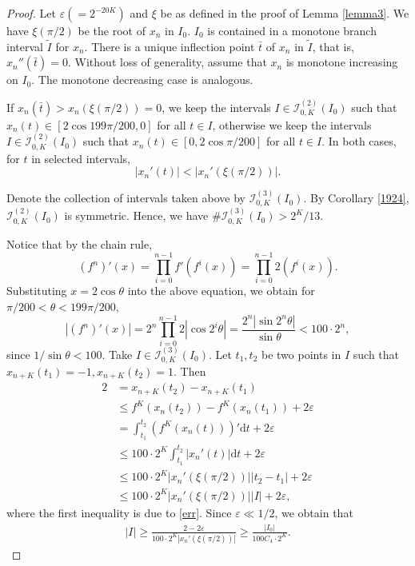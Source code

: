 \documentclass{amsart}
\theoremstyle{definition}
\begin{document}
\begin{proof}

Let $\varepsilon(=2^{-20K})$ and $\xi$ be as defined in the proof of Lemma \ref{lemma3}. 
We have $\xi(\pi/2)$ be the root of $x_n$ in $I_0$. 
$I_0$ is contained in a monotone branch interval $\tilde{I}$ for $x_n$.
There is a unique inflection point $\bar{t}$ of $x_n$ in $\tilde{I}$, 
that is, $x_n''(\bar{t})=0$.
Without loss of generality, assume that $x_n$ is monotone increasing on $I_0$.
The monotone decreasing case is analogous.

If $x_n(\bar{t})>x_n(\xi(\pi/2))=0$, we keep the intervals
$I\in\mathcal{I}_{0,K}^{(2)}(I_0)$ such that
$x_n(t)\in[2\cos{199\pi/200},0]$ for all $t\in I$, 
otherwise we keep the intervals $I\in\mathcal{I}_{0,K}^{(2)}(I_0)$ such that
$x_n(t)\in[0,2\cos{\pi/200}]$ for all $t\in I$. 
In both cases, for $t$ in selected intervals, 
$$|x_n'(t)|<|x_n'(\xi(\pi/2))|.$$ 

Denote the collection of intervals taken above by
 $\mathcal{I}_{0,K}^{(3)}(I_0)$.
 By Corollary \ref{1924}, $\mathcal{I}_{0,K}^{(2)}(I_0)$ is
symmetric. Hence, we have $\#\mathcal{I}_{0,K}^{(3)}(I_0)>2^K/13$.


Notice that by the chain rule,
\begin{equation*}
(f^n)'(x)=\prod_{i=0}^{n-1}f'(f^{i}(x))=\prod_{i=0}^{n-1}2(f^{i}(x)).
\end{equation*}
Substituting $x=2\cos{\theta}$ into the above equation, we obtain for $\pi/200<\theta<199\pi/200$,
\begin{equation*}
|(f^n)'(x)|=2^n\prod_{i=0}^{n-1}2|\cos{2^i\theta}|=\frac{2^n|\sin{2^n\theta}|}{\sin{\theta}}
<100\cdot 2^n,
\end{equation*}
since $1/\sin{\theta}<100$.
Take $I\in \mathcal{I}_{0,K}^{(3)}(I_0)$.
Let $t_1,t_2$ be two points in $I$ such that
$x_{n+K}(t_1)=-1,x_{n+K}(t_2)=1$.
Then
\begin{equation*}
    \begin{aligned}
   2&=x_{n+K}(t_2)-x_{n+K}(t_1)\\
   &\le f^{K}(x_n(t_2))-f^{K}(x_n(t_1))+2\varepsilon\\
   &=\int_{t_1}^{t_2}(f^{K}(x_n(t)))'\mathrm{d}t+2\varepsilon\\
   &\le 100\cdot 2^K\int_{t_1}^{t_2}|x_n'(t)|\mathrm{d}t+2\varepsilon\\
   &\le 100\cdot 2^K|x_n'(\xi(\pi/2))||t_2-t_1|+2\varepsilon\\
   &\le 100\cdot 2^K|x_n'(\xi(\pi/2))||I|+2\varepsilon,
    \end{aligned}
\end{equation*}
where the first inequality is due to \eqref{err}.
Since $\varepsilon\ll1/2$, we obtain that 
\begin{equation*}
    \begin{aligned}
  |I|\ge \frac{2-2\varepsilon}{100\cdot 2^K|x_n'(\xi(\pi/2))|}
  \ge \frac{|I_0|}{100C_4\cdot 2^K}.
    \end{aligned}
\end{equation*}
\end{proof}
\end{document}
